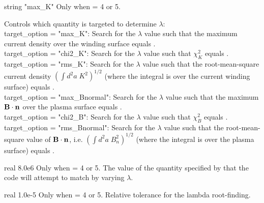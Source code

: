{string}
{{\ttfamily "max\_K"}}
{Only when  = 4 or 5.}
{Controls which quantity is targeted to determine $\lambda$:\\

{\ttfamily target\_option = "max\_K"}: Search for the $\lambda$ value such that the maximum
current density over the winding surface equals .\\

{\ttfamily target\_option = "chi2\_K"}: Search for the $\lambda$ value such that $\chi^2_K$ equals .\\

{\ttfamily target\_option = "rms\_K"}: Search for the $\lambda$ value such that the root-mean-square current density
$\left( \int d^2a\; K^2 \right)^{1/2}$ (where the integral is over the current winding surface) equals .\\

{\ttfamily target\_option = "max\_Bnormal"}: Search for the $\lambda$ value such that the maximum
${\mathbf B}\cdot{\mathbf n}$ over the plasma surface equals .\\

{\ttfamily target\_option = "chi2\_B"}: Search for the $\lambda$ value such that $\chi^2_B$ equals .\\

{\ttfamily target\_option = "rms\_Bnormal"}: Search for the $\lambda$ value such that the root-mean-square value of ${\mathbf B}\cdot{\mathbf n}$, i.e.
$\left( \int d^2a\; B_n^2 \right)^{1/2}$ (where the integral is over the plasma surface) equals .

}

\myhrule

{real}
{8.0e6}
{Only when  = 4 or 5.}
{The value of the quantity specified by  that the code will attempt to match
by varying $\lambda$.
}

\myhrule

{real}
{1.0e-5}
{Only when  = 4 or 5.}
{Relative tolerance for the lambda root-finding.}
